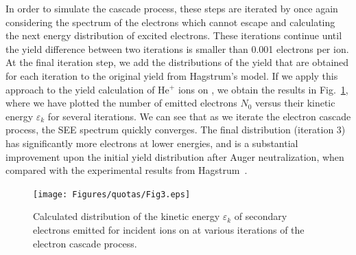 \begin{refsection}
In order to simulate the cascade process, these steps are iterated by once 
again considering the spectrum of the electrons which cannot escape and 
calculating the next energy distribution of excited electrons. These 
iterations continue until the yield difference between two iterations is 
smaller than 0.001 electrons per ion. At the final iteration step, we add the 
distributions of the yield that are obtained for each iteration to the 
original yield from Hagstrum's model. If we apply this approach to the yield 
calculation of He$^+$ ions on , we obtain the results in 
Fig.~\ref{quotas:fig-iterations}, where we have plotted the number of emitted 
electrons $N_0$ versus their kinetic energy $\varepsilon_k$ for several 
iterations. We can see that as we iterate the electron cascade process, the 
SEE spectrum quickly converges. The final distribution (iteration 3) has 
significantly more electrons at lower energies, and is a substantial 
improvement upon the initial yield distribution after Auger neutralization, 
when compared with the experimental results from Hagstrum~\cite{Hagstrum1960}. 
 
\begin{figure}[ht] 
\centering 
\captionsetup{width=0.9\textwidth}
\texttt{[image: Figures/quotas/Fig3.eps]} 
\caption{\label{quotas:fig-iterations} Calculated distribution of the kinetic 
energy $\varepsilon_k$ of secondary electrons emitted for incident  
ions on  at various iterations of the electron cascade process.} 
\end{figure} 



\end{refsection}
